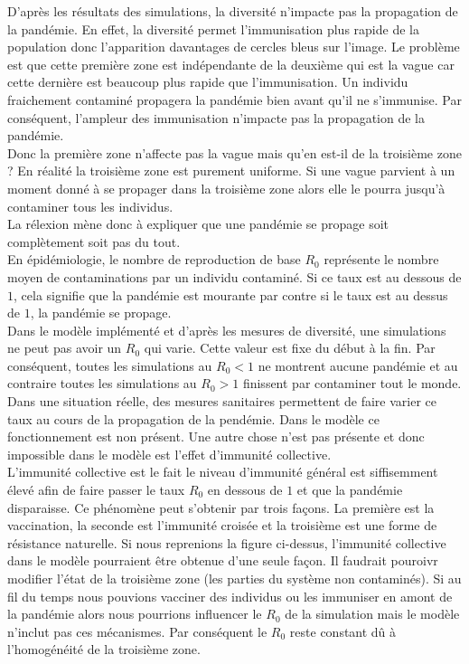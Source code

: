 D'après les résultats des simulations, la diversité n'impacte pas la propagation de la pandémie. En effet, la diversité permet l'immunisation plus rapide de la population donc l'apparition davantages de cercles bleus sur l'image. Le problème est que cette première zone est indépendante de la deuxième qui est la vague car cette dernière est beaucoup plus rapide que l'immunisation. Un individu fraichement contaminé propagera la pandémie bien avant qu'il ne s'immunise. Par conséquent, l'ampleur des immunisation n'impacte pas la propagation de la pandémie.\\

Donc la première zone n'affecte pas la vague mais qu'en est-il de la troisième zone ? En réalité la troisième zone est purement uniforme. Si une vague parvient à un moment donné à se propager dans la troisième zone alors elle le pourra jusqu'à contaminer tous les individus.\\

La rélexion mène donc à expliquer que une pandémie se propage soit complètement soit pas du tout.\\

En épidémiologie, le nombre de reproduction de base $R_0$ représente le nombre moyen de contaminations par un individu contaminé. Si ce taux est au dessous de $1$, cela signifie que la pandémie est mourante par contre si le taux est au dessus de $1$, la pandémie se propage.\\

Dans le modèle implémenté et d'après les mesures de diversité, une simulations ne peut pas avoir un $R_0$ qui varie. Cette valeur est fixe du début à la fin. Par conséquent, toutes les simulations au $R_0 < 1$ ne montrent aucune pandémie et au contraire toutes les simulations au $R_0 > 1$ finissent par contaminer tout le monde. Dans une situation réelle, des mesures sanitaires permettent de faire varier ce taux au cours de la propagation de la pendémie. Dans le modèle ce fonctionnement est non présent. Une autre chose n'est pas présente et donc impossible dans le modèle est l'effet d'immunité collective.\\

L'immunité collective est le fait le niveau d'immunité général est siffisemment élevé afin de faire passer le taux $R_0$ en dessous de $1$ et que la pandémie disparaisse. Ce phénomène peut s'obtenir par trois façons. La première est la vaccination, la seconde est l'immunité croisée et la troisième est une forme de résistance naturelle. Si nous reprenions la figure ci-dessus, l'immunité collective dans le modèle pourraient être obtenue d'une seule façon. Il faudrait pouroivr modifier l'état de la troisième zone (les parties du système non contaminés). Si au fil du temps nous pouvions vacciner des individus ou les immuniser en amont de la pandémie alors nous pourrions influencer le $R_0$ de la simulation mais le modèle n'inclut pas ces mécanismes. Par conséquent le $R_0$ reste constant dû à l'homogénéité de la troisième zone.

